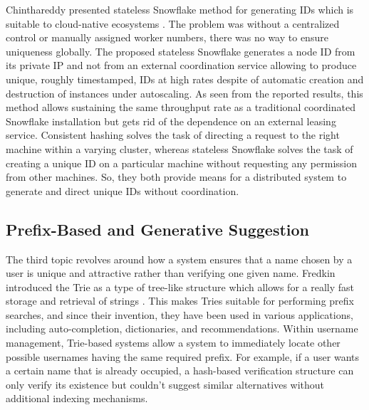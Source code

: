 \documentclass[conference]{IEEEtran}
\begin{document}
Chinthareddy presented stateless Snowflake method for generating IDs which is suitable to cloud-native ecosystems \cite{b4}. The problem was without a centralized control or manually assigned worker numbers, there was no way to ensure uniqueness globally. The proposed stateless
Snowflake generates a node ID from its private IP and not from an external coordination service allowing to produce unique, roughly timestamped, IDs at high rates despite of automatic creation and destruction of instances under autoscaling. As seen from the reported results, this method allows sustaining the same throughput rate as a
traditional coordinated Snowflake installation but gets rid of the
dependence on an external leasing service. Consistent hashing solves
the task of directing a request to the right machine within a varying
cluster, whereas stateless Snowflake solves the task of creating a
unique ID on a particular machine without requesting any permission from other machines. So, they both provide means for a distributed
system to generate and direct unique IDs without coordination.

\subsection{Prefix-Based and Generative Suggestion}
The third topic revolves around how a system ensures that a name chosen by a user is unique and attractive rather than verifying one given name.
Fredkin introduced the Trie as a type of tree-like structure which allows for a really fast storage and retrieval of strings \cite{b5}. This makes Tries suitable for performing prefix searches, and since their invention, they have been used in various applications, including auto-completion, dictionaries, and recommendations. Within username management, Trie-based systems allow a system to immediately locate other possible usernames having the same required prefix. For example, if a user wants a certain name that is already occupied, a hash-based verification structure can only verify its existence but couldn't suggest similar alternatives without additional indexing mechanisms.
\end{document}
